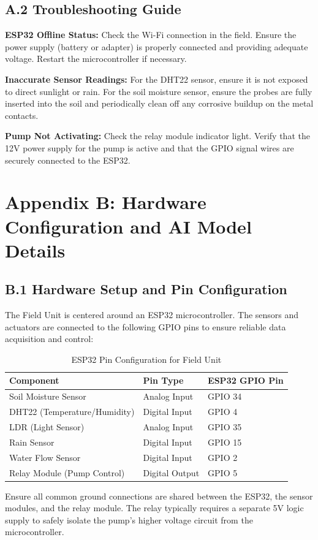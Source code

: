 \subsection*{A.2 Troubleshooting Guide}
\textbf{ESP32 Offline Status:} Check the Wi-Fi connection in the field. Ensure the power supply (battery or adapter) is properly connected and providing adequate voltage. Restart the microcontroller if necessary.

\textbf{Inaccurate Sensor Readings:} For the DHT22 sensor, ensure it is not exposed to direct sunlight or rain. For the soil moisture sensor, ensure the probes are fully inserted into the soil and periodically clean off any corrosive buildup on the metal contacts.

\textbf{Pump Not Activating:} Check the relay module indicator light. Verify that the 12V power supply for the pump is active and that the GPIO signal wires are securely connected to the ESP32.



\section*{Appendix B: Hardware Configuration and AI Model Details}

\subsection*{B.1 Hardware Setup and Pin Configuration}
The Field Unit is centered around an ESP32 microcontroller. The sensors and actuators are connected to the following GPIO pins to ensure reliable data acquisition and control:
\begin{table}[H]
\centering
\begin{tabular}{|l|l|l|}
\hline
\textbf{Component} & \textbf{Pin Type} & \textbf{ESP32 GPIO Pin} \\ \hline
Soil Moisture Sensor & Analog Input & GPIO 34 \\ \hline
DHT22 (Temperature/Humidity) & Digital Input & GPIO 4 \\ \hline
LDR (Light Sensor) & Analog Input & GPIO 35 \\ \hline
Rain Sensor & Digital Input & GPIO 15 \\ \hline
Water Flow Sensor & Digital Input & GPIO 2 \\ \hline
Relay Module (Pump Control) & Digital Output & GPIO 5 \\ \hline
\end{tabular}
\caption{ESP32 Pin Configuration for Field Unit}
\label{tab:pin_config}
\end{table}
Ensure all common ground connections are shared between the ESP32, the sensor modules, and the relay module. The relay typically requires a separate 5V logic supply to safely isolate the pump's higher voltage circuit from the microcontroller.

